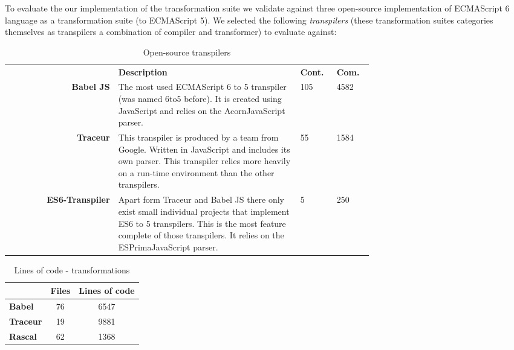 To evaluate the our implementation of the transformation suite we validate against three open-source implementation of ECMAScript 6 language as a transformation suite (to ECMAScript 5). We selected the following \textit{transpilers} (these transformation suites categories themselves as transpilers a combination of compiler and transformer) to evaluate against:

\begin{table}[h]
\def\arraystretch{1.5}
\caption{Open-source transpilers}
\label{transpilers}
\begin{tabular}{rp{0.5\linewidth}p{0.1\linewidth}p{0.1\linewidth}}
 & \textbf{Description} & \textbf{Cont.} & \textbf{Com.} \\
{\bf Babel JS\footnotemark[1]} & The most used ECMAScript 6 to 5 transpiler (was named 6to5 before). It is created using JavaScript and relies on the Acorn\footnotemark[4] JavaScript parser. & 105 & 4582 \\
{\bf Traceur\footnotemark[2]} & This transpiler is produced by a team from Google. Written in JavaScript and includes its own parser. This transpiler relies more heavily on a run-time environment than the other transpilers. & 55 & 1584\\
{\bf ES6-Transpiler\footnotemark[3]} & Apart form Traceur and Babel JS there only exist small individual projects that implement ES6 to 5 transpilers. This is the most feature complete of those transpilers. It relies on the ESPrima\footnotemark[5] JavaScript parser. & 5 & 250 \\
\end{tabular}
\end{table}

\begin{table}[h]
\centering
\caption{Lines of code - transformations}
\label{loc-transformations}
\begin{tabular}{@{}lcc@{}}
\toprule
              & {\bf Files} & \multicolumn{1}{l}{{\bf Lines of code}} \\ \midrule
{\bf Babel}   & 76          & 6547                                    \\
{\bf Traceur} & 19          & 9881                                    \\
{\bf Rascal}  & 62          & 1368                                    \\ \bottomrule
\end{tabular}
\end{table}

